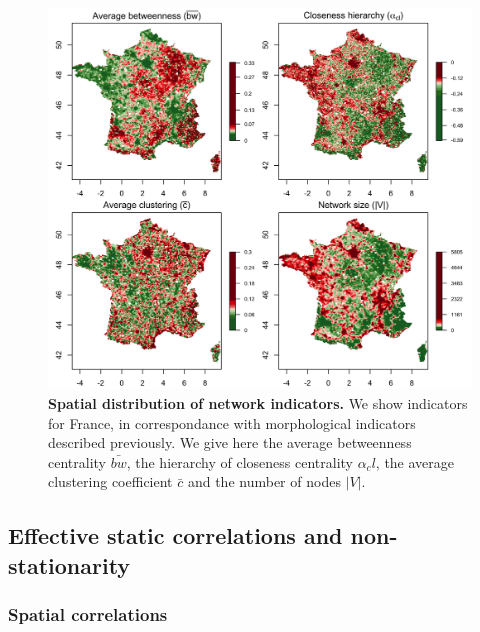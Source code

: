 \begin{figure}
\includegraphics[width=\linewidth]{figures/indics_network_en_areasize100_offset50_factor0_5.png}
\caption{\textbf{Spatial distribution of network indicators.} We show indicators for France, in correspondance with morphological indicators described previously. We give here the average betweenness centrality $\bar{bw}$, the hierarchy of closeness centrality $\alpha_cl$, the average clustering coefficient $\bar{c}$ and the number of nodes $\left|V\right|$.\label{fig:staticcorrs:network}}
\end{figure}


\subsection{Effective static correlations and non-stationarity}


\subsubsection{Spatial correlations}


